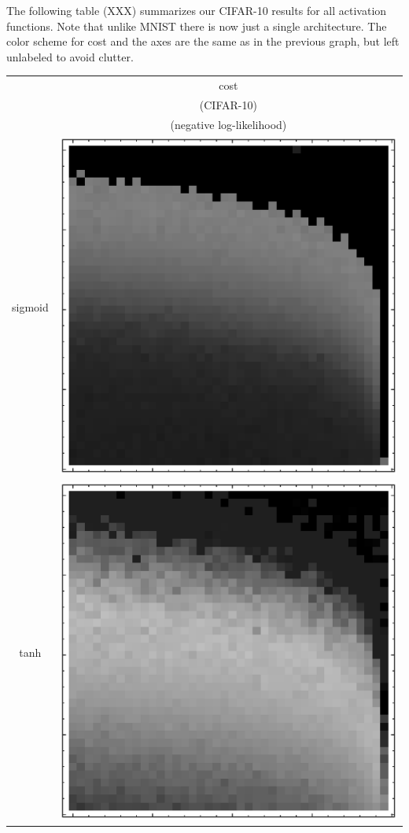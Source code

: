 \documentclass[10pt]{article}
\begin{document}
The following table (XXX) summarizes our CIFAR-10 results for all
activation functions.  Note that unlike MNIST there is now just a
single architecture.  The color scheme for cost and the axes are the
same as in the previous graph, but left unlabeled to avoid clutter.

\begin{tabular}{|c|c|}
        \hline
        & {\LARGE cost} \\
        & (CIFAR-10) \\
        & (negative log-likelihood) \\
        \hline
sigmoid 
        & \includegraphics[scale=0.25]{plots/simple/LF-20S10S-20T10-CIFAR-3.eps} \\ \hline
tanh 
        & \includegraphics[scale=0.25]{plots/simple/LF-20T10T-20T10-CIFAR-3.eps} \\ \hline

\end{tabular}
\end{document}
